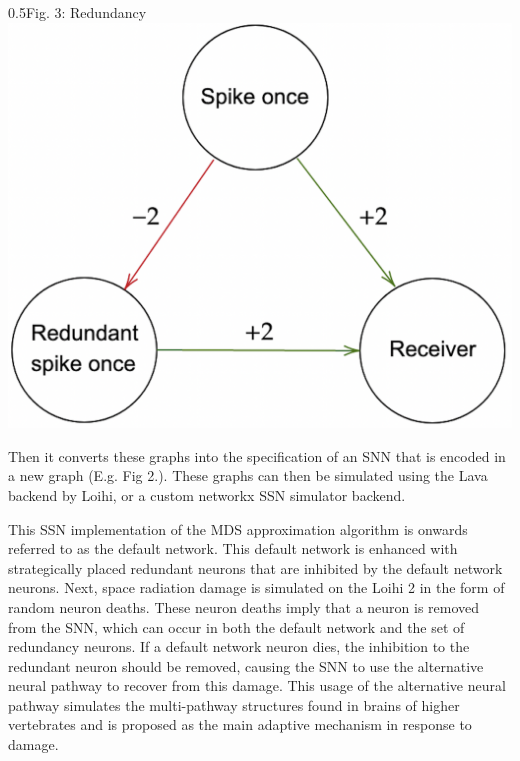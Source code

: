 \begin{rudifig}{0.5\hsize}{Fig. 3: Redundancy}
    \includegraphics[width=1\linewidth]{latex/Images/brain_adaptation_alternative.png}
    \label{fig:eg_brain_adaptation}
\end{rudifig}

Then it converts these graphs into the specification of an SNN that is encoded in a new graph (E.g. Fig 2.). These graphs can then be simulated using the Lava backend by Loihi, or a custom networkx SSN simulator backend.

\noindent This SSN implementation of the MDS approximation algorithm is onwards referred to as the default network. This default network is enhanced with strategically placed redundant neurons that are inhibited by the default network neurons. Next, space radiation damage is simulated on the Loihi 2 in the form of random neuron deaths. These neuron deaths imply that a neuron is removed from the SNN, which can occur in both the default network and the set of redundancy neurons. If a default network neuron dies, the inhibition to the redundant neuron should be removed, causing the SNN to use the alternative neural pathway to recover from this damage. This usage of the alternative neural pathway simulates the multi-pathway structures found in brains of higher vertebrates and is proposed as the main adaptive mechanism in response to damage.

